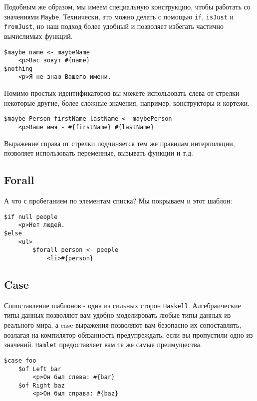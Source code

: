 Подобным же образом, мы имеем специальную конструкцию, чтобы работать 
со значениями \lstinline!Maybe!. Технически, это можно делать с помощью \texttt{if}, 
\texttt{isJust} и \texttt{fromJust}, но наш подход более удобный и позволяет
избегать частично вычислимых функций.

\begin{lstlisting}
$maybe name <- maybeName
    <p>Ваc зовут #{name}
$nothing
    <p>Я не знаю Вашего имени.
\end{lstlisting}

Помимо простых идентификаторов вы можете использовать слева от стрелки некоторые другие, 
более сложные значения, например, конструкторы и кортежи.

\begin{lstlisting}
$maybe Person firstName lastName <- maybePerson
    <p>Ваше имя - #{firstName} #{lastName}
\end{lstlisting}

Выражение справа от стрелки подчиняется тем же правилам интерполяции, 
позволяет использовать переменные, вызывать функции и т.д.

\subsection{Forall}

А что с пробеганием по элементам списка? Мы покрываем и этот шаблон:

\begin{lstlisting}
$if null people
    <p>Нет людей.
$else
    <ul>
        $forall person <- people
            <li>#{person}
\end{lstlisting}


\subsection{Case}

Сопоставление шаблонов - одна из сильных сторон \texttt{Haskell}. Алгебраические типы данных
позволяют вам удобно моделировать любые типы данных из реального мира, а 
case-выражения позволяют вам безопасно их сопоставлять, возлагая на компилятор
обязанность предупреждать, если вы пропустили одно из значений.
\texttt{Hamlet} предоставляет вам те же самые преимущества.

\begin{lstlisting}
$case foo
    $of Left bar
        <p>Он был слева: #{bar}
    $of Right baz
        <p>Он был справа: #{baz}
\end{lstlisting}

